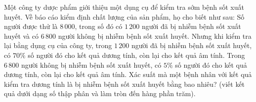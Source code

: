 \begin{ex}%
Một công ty dược phẩm giới thiệu một dụng cụ để kiểm tra sớm bệnh sốt xuất huyết. Về báo cáo kiểm định chất lượng của sản phẩm, họ cho biết như sau: Số người được thử là $8\,000$, trong số đó có $1\,200$ người đã bị nhiễm bệnh sốt xuất huyết và có $6\,800$ người không bị nhiễm bệnh sốt xuất huyết. Nhưng khi kiểm tra lại bằng dụng cụ của công ty, trong $1\,200$ người đã bị nhiễm bệnh sốt xuất huyết, có $70\%$ số người đó cho kết quả dương tính, còn lại cho kết quả âm tính. Trong $6\,800$ người không bị nhiễm bệnh sốt xuất huyết, có $5\%$ số người đó cho kết quả dương tính, còn lại cho kết quả âm tính. Xác suất mà một bệnh nhân với kết quả kiểm tra dương tính là bị nhiễm bệnh sốt xuất huyết bằng bao nhiêu? (viết kết quả dưới dạng số thập phân và làm tròn đến hàng phần trăm).
\end{ex}

